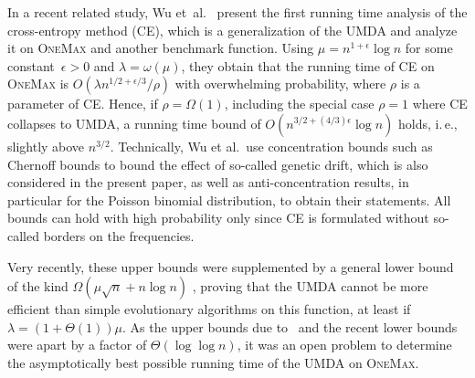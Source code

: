 \documentclass[11pt, a4paper]{article}
\newcommand*{\om}{\textsc{OneMax}\xspace}
\newcommand{\umda}{UMDA\xspace}
\newcommand{\ie}{i.\,e.\xspace}
\begin{document}
In a recent related study, Wu et~al.~\cite{WuKolonkoMoehringAnalysisCEIEEETEC} 
present the first running time analysis of the cross-entropy method (CE), 
which is a generalization of the \umda and analyze it on \om and another benchmark function. 
Using $\mu=n^{1+\epsilon}\log n$ for some constant~$\epsilon>0$ and 
$\lambda=\omega(\mu)$, they obtain that the running time of CE 
on \om is $O(\lambda n^{1/2+\epsilon/3}/\rho)$ with overwhelming probability, where $\rho$ is a parameter of CE.
Hence, if  $\rho=\Omega(1)$, including the special case $\rho=1$ where CE 
collapses to \umda, a running time bound of $O(n^{3/2+(4/3)\epsilon}\log n)$ 
holds, \ie, slightly above $n^{3/2}$\!.
 Technically, Wu et al.\ use concentration 
bounds such as Chernoff bounds to bound the effect of so-called genetic drift, 
which is also considered in the present paper, 
as well as anti-concentration results, in particular for the Poisson binomial distribution, to  
obtain their statements. All bounds can
hold with high probability only since CE is formulated without so-called borders on the frequencies.


Very recently, these upper bounds were supplemented 
by a general lower bound of the kind $\Omega(\mu\sqrt{n}+n\log n)$ \cite{KrejcaWittFOGA2017}, proving that 
the \umda cannot be more efficient than simple evolutionary algorithms on this function, at least if $\lambda=(1+\Theta(1))\mu$. As the upper bounds 
due to~\cite{DangLehreGECCO15} and the recent 
lower bounds were apart by a factor of $\Theta(\log\log n)$, it was an open problem 
to determine the asymptotically best possible running time of the \umda on \om.
\end{document}
